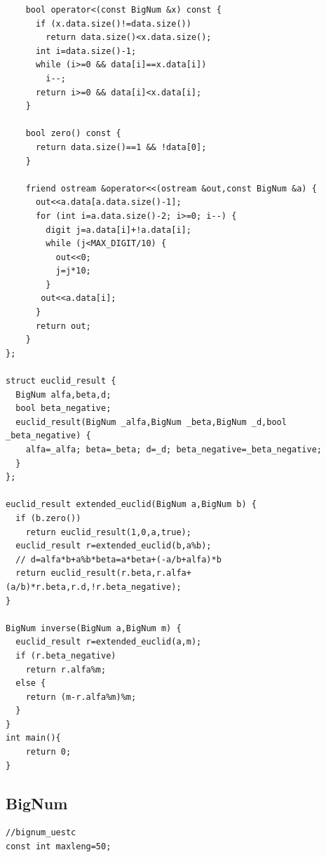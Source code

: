 \documentclass[a4paper]{article}
\begin{document}
\begin{CJK*}{UTF8}{gbsn}
\begin{multicols}{3}
\begin{flushleft}
\begin{lstlisting}
    bool operator<(const BigNum &x) const {
      if (x.data.size()!=data.size())
        return data.size()<x.data.size();
      int i=data.size()-1;
      while (i>=0 && data[i]==x.data[i])
        i--;
      return i>=0 && data[i]<x.data[i];
    }

    bool zero() const {
      return data.size()==1 && !data[0];
    }

    friend ostream &operator<<(ostream &out,const BigNum &a) {
      out<<a.data[a.data.size()-1];
      for (int i=a.data.size()-2; i>=0; i--) {
        digit j=a.data[i]+!a.data[i];
        while (j<MAX_DIGIT/10) {
          out<<0;
          j=j*10;
        }
       out<<a.data[i];
      }
      return out;
    }
};

struct euclid_result {
  BigNum alfa,beta,d;
  bool beta_negative;
  euclid_result(BigNum _alfa,BigNum _beta,BigNum _d,bool _beta_negative) {
    alfa=_alfa; beta=_beta; d=_d; beta_negative=_beta_negative;
  }
};

euclid_result extended_euclid(BigNum a,BigNum b) {
  if (b.zero())
    return euclid_result(1,0,a,true);
  euclid_result r=extended_euclid(b,a%b);
  // d=alfa*b+a%b*beta=a*beta+(-a/b+alfa)*b
  return euclid_result(r.beta,r.alfa+(a/b)*r.beta,r.d,!r.beta_negative);
}

BigNum inverse(BigNum a,BigNum m) {
  euclid_result r=extended_euclid(a,m);
  if (r.beta_negative)
    return r.alfa%m;
  else {
    return (m-r.alfa%m)%m;
  }
}
int main(){
    return 0;
}
\end{lstlisting}

\subsection{BigNum}
\begin{lstlisting}
//bignum_uestc
const int maxleng=50;


\end{lstlisting}
\end{flushleft}
\end{multicols}
\end{CJK*}
\end{document}
